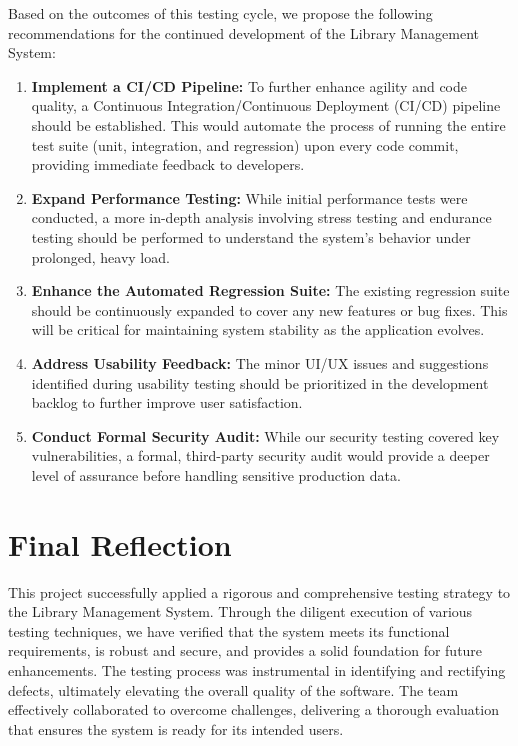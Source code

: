 Based on the outcomes of this testing cycle, we propose the following recommendations for the continued development of the Library Management System:
\begin{enumerate}
    \item \textbf{Implement a CI/CD Pipeline:} To further enhance agility and code quality, a Continuous Integration/Continuous Deployment (CI/CD) pipeline should be established. This would automate the process of running the entire test suite (unit, integration, and regression) upon every code commit, providing immediate feedback to developers.
    \item \textbf{Expand Performance Testing:} While initial performance tests were conducted, a more in-depth analysis involving stress testing and endurance testing should be performed to understand the system's behavior under prolonged, heavy load.
    \item \textbf{Enhance the Automated Regression Suite:} The existing regression suite should be continuously expanded to cover any new features or bug fixes. This will be critical for maintaining system stability as the application evolves.
    \item \textbf{Address Usability Feedback:} The minor UI/UX issues and suggestions identified during usability testing should be prioritized in the development backlog to further improve user satisfaction.
    \item \textbf{Conduct Formal Security Audit:} While our security testing covered key vulnerabilities, a formal, third-party security audit would provide a deeper level of assurance before handling sensitive production data.
\end{enumerate}

\section{Final Reflection}
\label{sec:final_reflection}

This project successfully applied a rigorous and comprehensive testing strategy to the Library Management System. Through the diligent execution of various testing techniques, we have verified that the system meets its functional requirements, is robust and secure, and provides a solid foundation for future enhancements. The testing process was instrumental in identifying and rectifying defects, ultimately elevating the overall quality of the software. The team effectively collaborated to overcome challenges, delivering a thorough evaluation that ensures the system is ready for its intended users.
